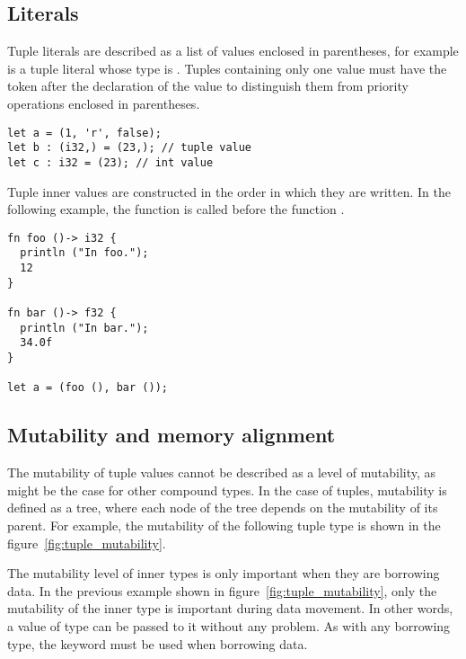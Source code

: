 \subsection {Literals}

Tuple literals are described as a list of values enclosed in parentheses, for
example  is a tuple literal whose type is . Tuples containing only one value must have the token \token{,}
after the declaration of the value to distinguish them from priority operations
enclosed in parentheses.

\begin{lstlisting}[style=coloredverbatim]
let a = (1, 'r', false);
let b : (i32,) = (23,); // tuple value
let c : i32 = (23); // int value
\end{lstlisting}

\noindent Tuple inner values are constructed in the order in which they are
written. In the following example, the function  is called before
the function .

\begin{lstlisting}[style=coloredverbatim]
fn foo ()-> i32 {
  println ("In foo.");
  12
}

fn bar ()-> f32 {
  println ("In bar.");
  34.0f
}

let a = (foo (), bar ());
\end{lstlisting}

\subsection {Mutability and memory alignment}%
\label{sec:tuple_mutability}

The mutability of tuple values cannot be described as a level of mutability, as
might be the case for other compound types. In the case of tuples, mutability is
defined as a tree, where each node of the tree depends on the mutability of its
parent. For example, the mutability of the following tuple type  is shown in the figure~\ref{fig:tuple_mutability}.



The mutability level of inner types is only important when they are borrowing
data. In the previous example shown in figure~\ref{fig:tuple_mutability}, only
the mutability of the inner type  is important during data movement.
In other words, a value of type  can be passed
to it without any problem. As with any borrowing type, the keyword
 must be used when borrowing data.

